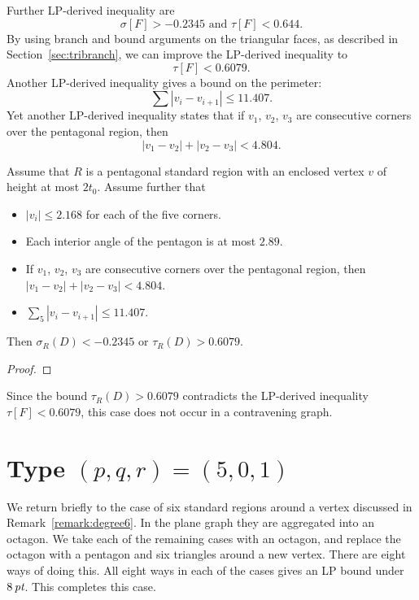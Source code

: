 Further LP-derived inequality are
    $$\sigma[F] > -0.2345 \text{ and }\tau[F] < 0.644.$$
By using branch and bound arguments on the triangular faces, as
described in Section~\ref{sec:tribranch}, we can improve the
LP-derived inequality to
    $$\tau[F] < 0.6079.$$
Another LP-derived inequality gives a bound on the perimeter:
    $$\sum |v_i-v_{i+1}|\le 11.407.$$
Yet another LP-derived inequality states that if $v_1$, $v_2$,
$v_3$ are consecutive corners over the pentagonal region, then
   $$|v_1-v_2|+|v_2-v_3|<4.804.$$

\begin{lemma}\label{lemma:6079:bis}  Assume that $R$ is a pentagonal standard region
    with an enclosed vertex $v$ of height at most $2t_0$.
    Assume further that
    \begin{itemize}
        \item $|v_i|\le 2.168$ for each of the five corners.
        \item Each interior angle of the pentagon is at most
        $2.89$.
        \item If $v_1$, $v_2$, $v_3$ are consecutive corners over
        the pentagonal region, then $|v_1-v_2|+|v_2-v_3|<4.804$.
        \item $\sum_5 |v_i-v_{i+1}|\le 11.407.$
    \end{itemize}
    Then $\sigma_R(D)< -0.2345$ or $\tau_R(D) > 0.6079.$
\end{lemma}


\begin{proof} 
\end{proof}

Since the bound $\tau_R(D)> 0.6079$ contradicts the LP-derived
inequality $\tau[F]<0.6079$, this case does not occur in a
contravening graph.


\section{Type $(p,q,r)=(5,0,1)$} %
\label{sec:3.10}

We return briefly to the case of six standard regions around a
vertex discussed in Remark~\ref{remark:degree6}.  In the plane
graph they are aggregated into an octagon.  We take each of the
remaining cases with an octagon, and replace the octagon with a
pentagon and six triangles around a new vertex.  There are eight
ways of doing this. All eight ways in each of the cases gives an
LP bound under $8\,\hbox{\it pt}$.  This completes this case.

